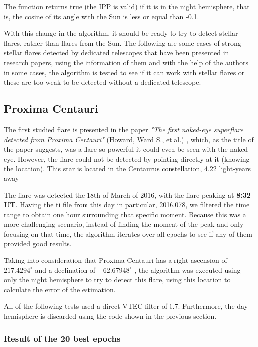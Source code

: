 The function returns true (the IPP is valid) if it is in the night hemisphere, that is, the cosine of its angle with the Sun is less or equal than -0.1.

With this change in the algorithm, it should be ready to try to detect stellar flares, rather than flares from the Sun. The following are some cases of strong stellar flares detected by dedicated telescopes that have been presented in research papers, using the information of them and with the help of the authors in some cases, the algorithm is tested to see if it can work with stellar flares or these are too weak to be detected without a dedicated telescope. 

\subsection{Proxima Centauri}

The first studied flare is presented in the paper \textit{"The first naked-eye superflare detected from Proxima Centauri"} (Howard, Ward S., et al.) \cite{howard2018first}, which, as the title of the paper suggests, was a flare so powerful it could even be seen with the naked eye. However, the flare could not be detected by pointing directly at it (knowing the location). This star is located in the Centaurus constellation, 4.22 light-years away

The flare was detected the 18th of March of 2016, with the flare peaking at\textbf{ 8:32 UT}. Having the ti file from this day in particular, 2016.078, we filtered the time range to obtain one hour surrounding that specific moment. Because this was a more challenging scenario, instead of finding the moment of the peak and only focusing on that time, the algorithm iterates over all epochs to see if any of them provided good results.

Taking into consideration that Proxima Centauri has a right ascension of $217.4294^{\circ}$ and a declination of $-62.67948^{\circ}$ \cite{proximawiki}, the algorithm was executed using only the night hemisphere to try to detect this flare, using this location to calculate the error of the estimation. 

All of the following tests used a direct VTEC filter of 0.7. Furthermore, the day hemisphere is discarded using the code shown in the previous section.

\subsubsection{Result of the 20 best epochs}

